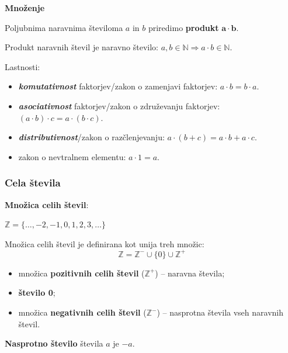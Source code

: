         \begin{frame}
            \textbf{\large{Množenje}}
            
            \bigskip
            Poljubnima naravnima številoma $a$ in $b$ priredimo \textbf{produkt} $\mathbf{a\cdot b}$.
            
            \bigskip
            Produkt naravnih števil je naravno število: $a, b \in \mathbb{N} \Rightarrow a \cdot b \in \mathbb{N}$.            

            \bigskip
            Lastnosti:
            \begin{itemize}
                \item \textit{\textbf{komutativnost}} faktorjev/zakon o zamenjavi faktorjev: $a \cdot b = b \cdot a$.
                \item \textit{\textbf{asociativnost}} faktorjev/zakon o združevanju faktorjev: $(a \cdot b) \cdot c = a \cdot (b \cdot c)$.
                \item \textit{\textbf{distributivnost}}/zakon o razčlenjevanju: $a \cdot (b+c) = a \cdot b + a \cdot c$.
                \item zakon o nevtralnem elementu: $a \cdot 1 = a$.
            \end{itemize}

        \end{frame}

        \begin{frame}
            \frametitle{Cela števila}

            \textbf{Množica celih števil}: 
                \begin{alertblock}{}
                    \centering\boldmath
                    $\mathbb{Z} = \{\ldots, -2, -1, 0, 1, 2, 3, \ldots\}$
                \end{alertblock}

                Množica celih števil je definirana kot unija treh množic:
                $$\mathbb{Z} = \mathbb{Z}^- \cup \{0\} \cup \mathbb{Z}^+$$

                \begin{itemize}
                    \item množica \textbf{pozitivnih celih števil} ($\mathbb{Z}^+$) -- naravna števila;
                    \item \textbf{število 0};
                    \item množica \textbf{negativnih celih števil} ($\mathbb{Z}^-$) -- nasprotna števila vseh naravnih števil.
                \end{itemize}
                
                \medskip
                \textbf{Nasprotno število} števila $a$ je $-a$.
        \end{frame}


